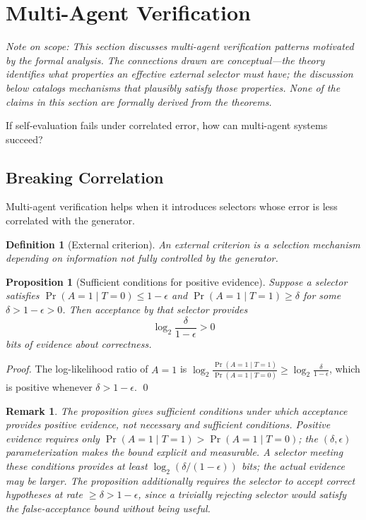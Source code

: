 \documentclass[11pt]{article}
\newtheorem{proposition}[theorem]{Proposition}
\newtheorem{definition}[theorem]{Definition}
\newtheorem{remark}[theorem]{Remark}
\begin{document}
\section{Multi-Agent Verification}

\emph{Note on scope: This section discusses multi-agent verification patterns motivated by
the formal analysis. The connections drawn are conceptual---the theory identifies what
properties an effective external selector must have; the discussion below catalogs
mechanisms that plausibly satisfy those properties. None of the claims in this section are
formally derived from the theorems.}

If self-evaluation fails under correlated error, how can multi-agent systems succeed?

\subsection{Breaking Correlation}

Multi-agent verification helps when it introduces selectors whose error is less correlated
with the generator.

\begin{definition}[External criterion]
An external criterion is a selection mechanism depending on information not fully controlled
by the generator.
\end{definition}

\begin{proposition}[Sufficient conditions for positive evidence]
\label{prop:multi_agent}
Suppose a selector satisfies $\Pr(A = 1 \mid T = 0) \leq 1 - \epsilon$ and
$\Pr(A = 1 \mid T = 1) \geq \delta$ for some $\delta > 1 - \epsilon > 0$. Then acceptance
by that selector provides
\begin{equation}
\log_2 \frac{\delta}{1 - \epsilon} > 0
\end{equation}
bits of evidence about correctness.
\end{proposition}

\begin{proof}
The log-likelihood ratio of $A=1$ is
$\log_2 \frac{\Pr(A=1 \mid T=1)}{\Pr(A=1 \mid T=0)} \geq \log_2 \frac{\delta}{1-\epsilon}$,
which is positive whenever $\delta > 1 - \epsilon$. \qed
\end{proof}

\begin{remark}
The proposition gives \emph{sufficient} conditions under which acceptance provides positive
evidence, not necessary and sufficient conditions. Positive evidence requires only
$\Pr(A=1 \mid T=1) > \Pr(A=1 \mid T=0)$; the $(\delta, \epsilon)$ parameterization makes
the bound explicit and measurable. A selector meeting these conditions provides at least
$\log_2(\delta/(1-\epsilon))$ bits; the actual evidence may be larger. The proposition
additionally requires the selector to accept correct hypotheses at rate $\geq \delta >
1-\epsilon$, since a trivially rejecting selector would satisfy the false-acceptance bound
without being useful.
\end{remark}
\end{document}
